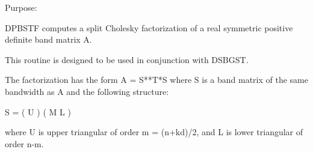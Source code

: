  \begin{DoxyParagraph}{Purpose\+: }
\begin{DoxyVerb} DPBSTF computes a split Cholesky factorization of a real
 symmetric positive definite band matrix A.

 This routine is designed to be used in conjunction with DSBGST.

 The factorization has the form  A = S**T*S  where S is a band matrix
 of the same bandwidth as A and the following structure:

   S = ( U    )
       ( M  L )

 where U is upper triangular of order m = (n+kd)/2, and L is lower
 triangular of order n-m.\end{DoxyVerb}
 
\end{DoxyParagraph}

